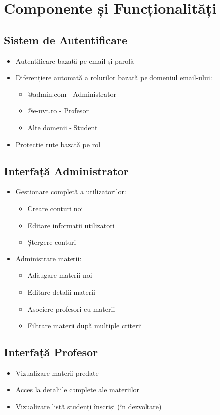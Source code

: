 \documentclass[12pt,a4paper]{article}
\begin{document}
\section{Componente și Funcționalități}
\subsection{Sistem de Autentificare}
\begin{itemize}
    \item Autentificare bazată pe email și parolă
    \item Diferențiere automată a rolurilor bazată pe domeniul email-ului:
    \begin{itemize}
        \item @admin.com - Administrator
        \item @e-uvt.ro - Profesor
        \item Alte domenii - Student
    \end{itemize}
    \item Protecție rute bazată pe rol
\end{itemize}

\subsection{Interfață Administrator}
\begin{itemize}
    \item Gestionare completă a utilizatorilor:
    \begin{itemize}
        \item Creare conturi noi
        \item Editare informații utilizatori
        \item Ștergere conturi
    \end{itemize}
    \item Administrare materii:
    \begin{itemize}
        \item Adăugare materii noi
        \item Editare detalii materii
        \item Asociere profesori cu materii
        \item Filtrare materii după multiple criterii
    \end{itemize}
\end{itemize}

\subsection{Interfață Profesor}
\begin{itemize}
    \item Vizualizare materii predate
    \item Acces la detaliile complete ale materiilor
    \item Vizualizare listă studenți înscriși (în dezvoltare)
\end{itemize}
\end{document}
